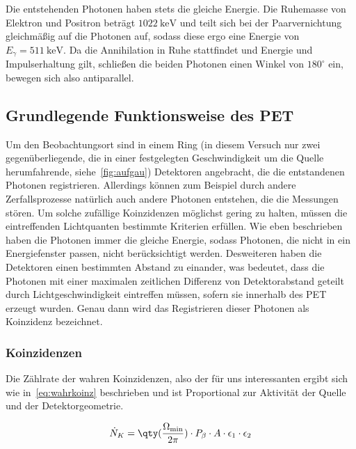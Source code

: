 \documentclass[slug=PET, room=Andreas-Schubert-Bau\,\ 424A, supervisor=Carsten\ Bittrich, coursedate=10.\ 01.\ 2020]{../../Lab_Report_LaTeX/lab_report}
\begin{document}
Die entstehenden Photonen haben stets die gleiche Energie. Die Ruhemasse von Elektron und Positron
beträgt \(\SI{1022}{\kilo\electronvolt}\) und teilt sich bei der Paarvernichtung gleichmäßig auf
die Photonen auf, sodass diese ergo eine Energie von \(E_\gamma = \SI{511}{\kilo\electronvolt}\).
Da die Annihilation in Ruhe stattfindet und Energie und Impulserhaltung gilt, schließen die beiden
Photonen einen Winkel von \(180^\circ\) ein, bewegen sich also antiparallel.\\

\subsection{Grundlegende Funktionsweise des PET}
\label{sec:fktweise}

Um den Beobachtungsort sind in einem Ring (in diesem Versuch nur zwei
gegenüberliegende, die in einer festgelegten Geschwindigkeit um die
Quelle herumfahrende, siehe~\ref{fig:aufgau}) Detektoren angebracht,
die die entstandenen Photonen registrieren.  Allerdings können zum
Beispiel durch andere Zerfallsprozesse natürlich auch andere Photonen
entstehen, die die Messungen stören. Um solche zufällige Koinzidenzen
möglichst gering zu halten, müssen die eintreffenden Lichtquanten
bestimmte Kriterien erfüllen.  Wie eben beschrieben haben die Photonen
immer die gleiche Energie, sodass Photonen, die nicht in ein
Energiefenster passen, nicht berücksichtigt werden. Desweiteren haben
die Detektoren einen bestimmten Abstand zu einander, was bedeutet,
dass die Photonen mit einer maximalen zeitlichen Differenz von
Detektorabstand geteilt durch Lichtgeschwindigkeit eintreffen müssen,
sofern sie innerhalb des PET erzeugt wurden. Genau dann wird das
Registrieren dieser Photonen als Koinzidenz bezeichnet.

\subsubsection{Koinzidenzen}
\label{sec:koinz}

Die Zählrate der wahren Koinzidenzen, also der für uns interessanten
ergibt sich wie in~\eqref{eq:wahrkoinz} beschrieben und ist
Proportional zur Aktivität der Quelle und der Detektorgeometrie.

\begin{equation}\label{eq:wahrkoinz}
        \dot N_K = \qty(\frac{\Omega_{\min}}{2 \pi}) \cdot P_\beta\cdot A \cdot \epsilon_1\cdot\epsilon_2
\end{equation}
\end{document}
